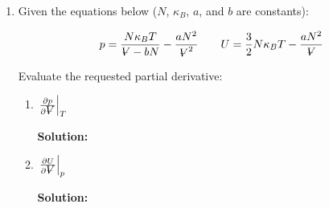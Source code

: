 \documentclass[10pt]{article}
\newenvironment{Solution}
    {\textbf{Solution:}
    
    \vspace{5mm}
    \begin{tcolorbox}
    }
    {
    \end{tcolorbox}
    \vspace{5mm}
    }
\newcommand{\vol}{{\ooalign{\hfil$V$\hfil\cr\kern0.08em--\hfil\cr}}}
\begin{document}
\begin{enumerate}
\begin{enumerate}
    \begin{Solution}    
    
    
    \end{Solution}
    
    \item Based on the sign of these response functions (assume $C_v \geq 0$, $\kappa_s \geq 0$, we will prove this later), find inequalities for $\alpha$ and $\beta$.
    
    \begin{Solution}    
    
    
    \end{Solution}

\end{enumerate}

\item Given the equations below ($N$, $\kappa_B$, $a$, and $b$ are constants):

\begin{equation}
    p = \frac{N\kappa_B T}{\vol -b N}-\frac{a N^2}{\vol^2} \qquad U = \frac{3}{2} N \kappa_B T - \frac{a N^2}{\vol}
\end{equation}

Evaluate the requested partial derivative: 

\begin{enumerate}
    \item $\left.\frac{\partial p}{\partial \vol}\right|_T$
    
    
    \begin{Solution}
    
    
    \end{Solution}

    \item $\left.\frac{\partial U}{\partial \vol}\right|_p$
    

    \begin{Solution}
    
    
    \end{Solution}
\end{enumerate}



\end{enumerate}
\end{document}
